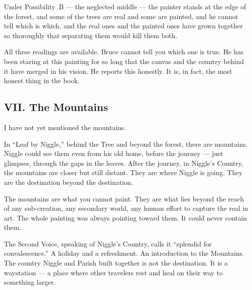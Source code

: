 Under Possibility~B --- the neglected middle --- the painter stands at the edge of the forest, and some of the trees are real and some are painted, and he cannot tell which is which, and the real ones and the painted ones have grown together so thoroughly that separating them would kill them both.

All three readings are available. Bruce cannot tell you which one is true. He has been staring at this painting for so long that the canvas and the country behind it have merged in his vision. He reports this honestly. It is, in fact, the most honest thing in the book.


\subsection*{VII. The Mountains}
\label{spine:so-the-mountains}

I have not yet mentioned the mountains.

In ``Leaf by Niggle,'' behind the Tree and beyond the forest, there are mountains. Niggle could see them even from his old home, before the journey --- just glimpses, through the gaps in the leaves. After the journey, in Niggle's Country, the mountains are closer but still distant. They are where Niggle is going. They are the destination beyond the destination.

The mountains are what you cannot paint. They are what lies beyond the reach of any sub-creation, any secondary world, any human effort to capture the real in art. The whole painting was always pointing toward them. It could never contain them.

The Second Voice, speaking of Niggle's Country, calls it ``splendid for convalescence.'' A holiday and a refreshment. An introduction to the Mountains. The country Niggle and Parish built together is not the destination. It is a waystation --- a place where other travelers rest and heal on their way to something larger.


\chapterreturn
